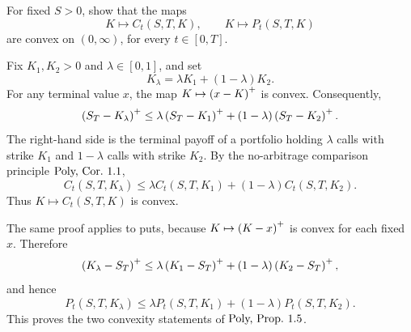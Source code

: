 \begin{exercise}
For fixed \(S>0\), show that the maps
\[
  K\mapsto C_t(S,T,K),\qquad K\mapsto P_t(S,T,K)
\]
are convex on \((0,\infty)\), for every \(t\in[0,T]\).
\end{exercise}

\begin{solution}
Fix \(K_1,K_2>0\) and \(\lambda\in[0,1]\), and set
\[
  K_\lambda=\lambda K_1+(1-\lambda)K_2.
\]
For any terminal value \(x\), the map \(K\mapsto\left(x-K\right)^+\) is convex.
Consequently,
\[
  \left(S_T-K_\lambda\right)^+
  \le
  \lambda\left(S_T-K_1\right)^++(1-\lambda)\left(S_T-K_2\right)^+.
\]
The right-hand side is the terminal payoff of a portfolio holding
\(\lambda\) calls with strike \(K_1\) and \(1-\lambda\) calls with strike
\(K_2\).  By the no-arbitrage comparison principle
\(\textup{Poly, Cor.~1.1}\),
\[
  C_t(S,T,K_\lambda)
  \le
  \lambda C_t(S,T,K_1)+(1-\lambda)C_t(S,T,K_2).
\]
Thus \(K\mapsto C_t(S,T,K)\) is convex.

The same proof applies to puts, because \(K\mapsto\left(K-x\right)^+\) is convex for
each fixed \(x\).  Therefore
\[
  \left(K_\lambda-S_T\right)^+
  \le
  \lambda\left(K_1-S_T\right)^++(1-\lambda)\left(K_2-S_T\right)^+,
\]
and hence
\[
  P_t(S,T,K_\lambda)
  \le
  \lambda P_t(S,T,K_1)+(1-\lambda)P_t(S,T,K_2).
\]
This proves the two convexity statements of \(\textup{Poly, Prop.~1.5}\).
\end{solution}
